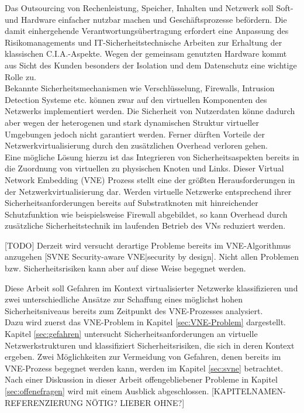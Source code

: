 Das Outsourcing von Rechenleistung, Speicher, Inhalten und Netzwerk soll Soft- und Hardware einfacher nutzbar machen und Geschäftsprozesse befördern. Die damit einhergehende Verantwortungsübertragung erfordert eine Anpassung des Risikomanagements und IT-Sicherheitstechnische Arbeiten zur Erhaltung der klassischen C.I.A.-Aspekte. Wegen der gemeinsam genutzten Hardware kommt aus Sicht des Kunden besonders der Isolation und dem Datenschutz eine wichtige Rolle zu.\\
Bekannte Sicherheitsmechanismen wie Verschlüsselung, Firewalls, Intrusion Detection Systeme etc. können zwar auf den virtuellen Komponenten des Netzwerks implementiert werden. Die Sicherheit von Nutzerdaten könne dadurch aber wegen der heterogenen und stark dynamischen Struktur virtueller Umgebungen jedoch nicht garantiert werden. Ferner dürften Vorteile der Netzwerkvirtualisierung durch den zusätzlichen Overhead verloren gehen. \cite{gong2016virtual}\\
Eine mögliche Lösung hierzu ist das Integrieren von Sicherheitsaspekten bereits in die Zuordnung von virtuellen zu physischen Knoten und Links. Dieser Virtual Network Embedding (VNE) Prozess stellt eine der größten Herausforderungen in der Netzwerkvirtualisierung dar. \cite{fischer2013virtual}
Werden virtuelle Netzwerke entsprechend ihrer Sicherheitsanforderungen bereits auf Substratknoten mit hinreichender Schutzfunktion wie beispielsweise Firewall abgebildet, so kann Overhead durch zusätzliche Sicherheitstechnik im laufenden Betrieb des VNs reduziert werden.

[TODO]
Derzeit wird versucht \cite{bays2012security, gong2016virtual, wang2016towards} derartige Probleme bereits im VNE-Algorithmus anzugehen [SVNE Security-aware VNE|security by design]. Nicht allen Problemen bzw. Sicherheitsrisiken kann aber auf diese Weise begegnet werden. %


Diese Arbeit soll Gefahren im Kontext virtualisierter Netzwerke klassifizieren und zwei unterschiedliche Ansätze zur Schaffung eines möglichst hohen Sicherheitsniveaus bereits zum Zeitpunkt des VNE-Prozesses analysiert.\\
Dazu wird zuerst das VNE-Problem in Kapitel \ref{sec:VNE-Problem} \textit{} dargestellt. Kapitel \ref{sec:gefahren} \textit{} untersucht Sicherheitsanforderungen an virtuelle Netzwerkstrukturen und klassifiziert Sicherheitsrisiken, die sich in deren Kontext ergeben. Zwei Möglichkeiten zur Vermeidung von Gefahren, denen bereits im VNE-Prozess begegnet werden kann, werden im Kapitel \ref{sec:svne} \textit{} betrachtet. Nach einer Diskussion in dieser Arbeit offengebliebener Probleme in Kapitel \ref{sec:offenefragen} \textit{} wird mit einem Ausblick abgeschlossen.
[KAPITELNAMEN-REFERENZIERUNG NÖTIG? LIEBER OHNE?]